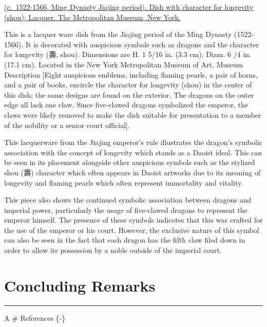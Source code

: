 \documentclass[
]{book}
\begin{document}
\href{https://www.metmuseum.org/art/collection/search/60870}{(c.~1522-1566, Ming Dynasty Jiajing period). Dish with character for longevity (shou); Lacquer. The Metropolitan Museum, New York.}

This is a lacquer ware dish from the Jiajing period of the Ming Dynasty (1522-1566). It is decorated with auspicious symbols such as dragons and the character for longevity (壽, shou). Dimensions are H. 1 5/16 in. (3.3 cm); Diam. 6 /4 in. (17.1 cm). Located in the New York Metropolitan Museum of Art. Museum Description {[}Eight auspicious emblems, including flaming pearls, a pair of horns, and a pair of books, encircle the character for longevity (shou) in the center of this dish; the same designs are found on the exterior. The dragons on the outer edge all lack one claw. Since five-clawed dragons symbolized the emperor, the claws were likely removed to make the dish suitable for presentation to a member of the nobility or a senior court official{]}.

This lacquerware from the Jiajing emperor's rule illustrates the dragon's symbolic association with the concept of longevity which stands as a Daoist ideal. This can be seen in its placement alongside other auspicious symbols such as the stylized shou (壽) character which often appears in Daoist artworks due to its meaning of longevity and flaming pearls which often represent immortality and vitality.

This piece also shows the continued symbolic association between dragons and imperial power, particularly the usage of five-clawed dragons to represent the emperor himself. The presence of these symbols indicates that this was crafted for the use of the emperor or his court. However, the exclusive nature of this symbol can also be seen in the fact that each dragon has the fifth claw filed down in order to allow its possession by a noble outside of the imperial court.

\hypertarget{conclusion}{%
\chapter*{Concluding Remarks}\label{conclusion}}

\begin{center}\rule{0.5\linewidth}{0.5pt}\end{center}

A
\# References \{-\}

  
\end{document}
